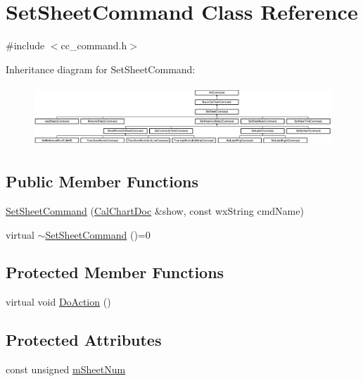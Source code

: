 \hypertarget{a00134}{\section{Set\-Sheet\-Command Class Reference}
\label{a00134}
}


{\ttfamily \#include $<$cc\-\_\-command.\-h$>$}

Inheritance diagram for Set\-Sheet\-Command\-:\begin{figure}[H]
\begin{center}
\leavevmode
\includegraphics[height=2.296651cm]{a00134}
\end{center}
\end{figure}
\subsection*{Public Member Functions}
\begin{DoxyCompactItemize}
\item 
\hyperlink{a00134_ab17fd49ea86264a6d65d595800627645}{Set\-Sheet\-Command} (\hyperlink{a00020}{Cal\-Chart\-Doc} \&show, const wx\-String cmd\-Name)
\item 
virtual \hyperlink{a00134_a27cdeef032261181cffd0316bbec0388}{$\sim$\-Set\-Sheet\-Command} ()=0
\end{DoxyCompactItemize}
\subsection*{Protected Member Functions}
\begin{DoxyCompactItemize}
\item 
virtual void \hyperlink{a00134_a027700275d409b94185dfb3aa2d792bb}{Do\-Action} ()
\end{DoxyCompactItemize}
\subsection*{Protected Attributes}
\begin{DoxyCompactItemize}
\item 
const unsigned \hyperlink{a00134_a12f42cb2ab2f659c8b1e097a2200d034}{m\-Sheet\-Num}
\end{DoxyCompactItemize}


